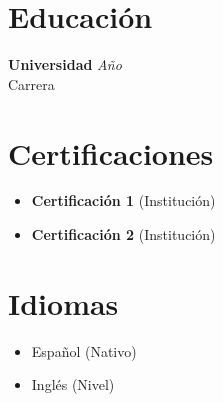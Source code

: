 \documentclass[11pt,a4paper]{article}
\begin{document}
\section*{Educación}
\noindent\textbf{Universidad} \hfill\textit{Año} \\
Carrera

\section*{Certificaciones}
\begin{itemize}
  \item \textbf{Certificación 1} (Institución)
  \item \textbf{Certificación 2} (Institución)
\end{itemize}

\section*{Idiomas}
\begin{itemize}
  \item Español (Nativo)
  \item Inglés (Nivel)
\end{itemize}
\end{document}
